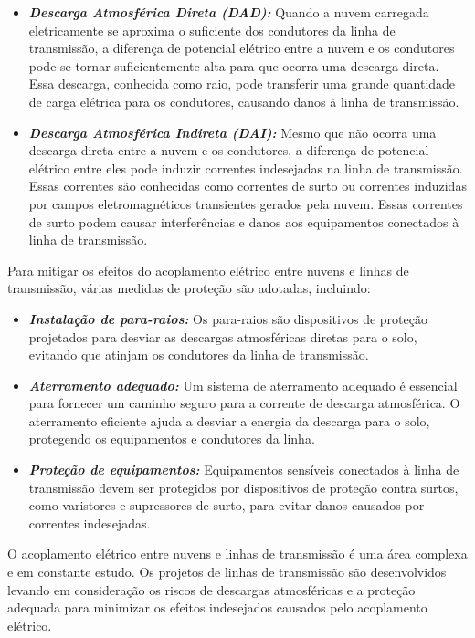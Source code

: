 \documentclass[a4paper, 12pt, onecolumn,singlespacing]{article}
\begin{document}
	\begin{itemize}
		\item \textbf{\textit{Descarga Atmosférica Direta (DAD):}} Quando a nuvem carregada eletricamente se aproxima o suficiente dos condutores da linha de transmissão, a diferença de potencial elétrico entre a nuvem e os condutores pode se tornar suficientemente alta para que ocorra uma descarga direta. Essa descarga, conhecida como raio, pode transferir uma grande quantidade de carga elétrica para os condutores, causando danos à linha de transmissão.
		
		\item \textbf{\textit{Descarga Atmosférica Indireta (DAI):}} Mesmo que não ocorra uma descarga direta entre a nuvem e os condutores, a diferença de potencial elétrico entre eles pode induzir correntes indesejadas na linha de transmissão. Essas correntes são conhecidas como correntes de surto ou correntes induzidas por campos eletromagnéticos transientes gerados pela nuvem. Essas correntes de surto podem causar interferências e danos aos equipamentos conectados à linha de transmissão.
		
	\end{itemize}
	
	Para mitigar os efeitos do acoplamento elétrico entre nuvens e linhas de transmissão, várias medidas de proteção são adotadas, incluindo:
	
	\begin{itemize}
		\item \textbf{\textit{Instalação de para-raios:}} Os para-raios são dispositivos de proteção projetados para desviar as descargas atmosféricas diretas para o solo, evitando que atinjam os condutores da linha de transmissão.
		\item \textbf{\textit{Aterramento adequado:}} Um sistema de aterramento adequado é essencial para fornecer um caminho seguro para a corrente de descarga atmosférica. O aterramento eficiente ajuda a desviar a energia da descarga para o solo, protegendo os equipamentos e condutores da linha.
		\item \textbf{\textit{Proteção de equipamentos:}} Equipamentos sensíveis conectados à linha de transmissão devem ser protegidos por dispositivos de proteção contra surtos, como varistores e supressores de surto, para evitar danos causados por correntes indesejadas.
	\end{itemize}
	
	O acoplamento elétrico entre nuvens e linhas de transmissão é uma área complexa e em constante estudo. Os projetos de linhas de transmissão são desenvolvidos levando em consideração os riscos de descargas atmosféricas e a proteção adequada para minimizar os efeitos indesejados causados pelo acoplamento elétrico.
	
\end{document}
